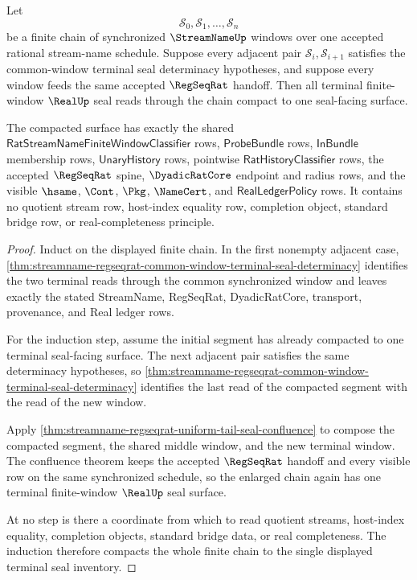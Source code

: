 \begin{theorem}
\label{thm:streamname-regseqrat-finite-window-chain-compaction}
Let
$$
\mathcal S_0,\mathcal S_1,\ldots,\mathcal S_n
$$
be a finite chain of synchronized $\StreamNameUp$ windows over one accepted
rational stream-name schedule. Suppose every adjacent pair
$\mathcal S_i,\mathcal S_{i+1}$ satisfies the common-window terminal seal
determinacy hypotheses, and suppose every window feeds the same accepted
$\RegSeqRat$ handoff. Then all terminal finite-window $\RealUp$ seal reads
through the chain compact to one seal-facing surface.

The compacted surface has exactly the shared
$\mathsf{RatStreamNameFiniteWindowClassifier}$ rows, $\mathsf{ProbeBundle}$
rows, $\mathsf{InBundle}$ membership rows, $\mathsf{UnaryHistory}$ rows,
pointwise $\mathsf{RatHistoryClassifier}$ rows, the accepted $\RegSeqRat$
spine, $\DyadicRatCore$ endpoint and radius rows, and the visible $\hsame$,
$\Cont$, $\Pkg$, $\NameCert$, and $\mathsf{RealLedgerPolicy}$ rows. It contains
no quotient stream row, host-index equality row, completion object, standard
bridge row, or real-completeness principle.
\end{theorem}
\begin{proof}
Induct on the displayed finite chain. In the first nonempty adjacent case,
\autoref{thm:streamname-regseqrat-common-window-terminal-seal-determinacy}
identifies the two terminal reads through the common synchronized window and
leaves exactly the stated StreamName, RegSeqRat, DyadicRatCore, transport,
provenance, and Real ledger rows.

For the induction step, assume the initial segment has already compacted to one
terminal seal-facing surface. The next adjacent pair satisfies the same
determinacy hypotheses, so
\autoref{thm:streamname-regseqrat-common-window-terminal-seal-determinacy}
identifies the last read of the compacted segment with the read of the new
window.

Apply \autoref{thm:streamname-regseqrat-uniform-tail-seal-confluence} to compose
the compacted segment, the shared middle window, and the new terminal window.
The confluence theorem keeps the accepted $\RegSeqRat$ handoff and every
visible row on the same synchronized schedule, so the enlarged chain again has
one terminal finite-window $\RealUp$ seal surface.

At no step is there a coordinate from which to read quotient streams,
host-index equality, completion objects, standard bridge data, or real
completeness. The induction therefore compacts the whole finite chain to the
single displayed terminal seal inventory.
\end{proof}
